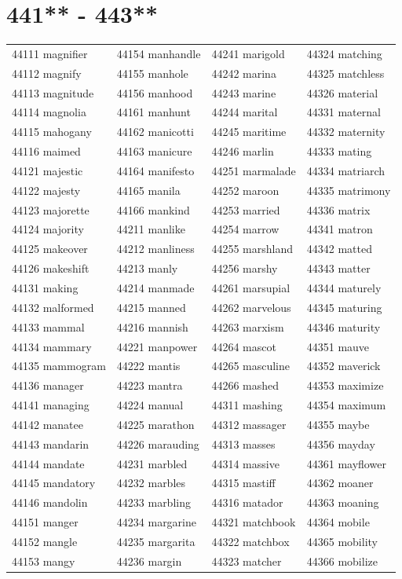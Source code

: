 \documentclass[10pt, oneside]{book}
\begin{document}
\begin{table}
	\centering
	\section*{441** - 443**}
	\begin{tabular}{l l l l}
44111 magnifier &44154 manhandle &44241 marigold &44324 matching\\
44112 magnify &44155 manhole &44242 marina &44325 matchless\\
44113 magnitude &44156 manhood &44243 marine &44326 material\\
44114 magnolia &44161 manhunt &44244 marital &44331 maternal\\
44115 mahogany &44162 manicotti &44245 maritime &44332 maternity\\
44116 maimed &44163 manicure &44246 marlin &44333 mating\\
44121 majestic &44164 manifesto &44251 marmalade &44334 matriarch\\
44122 majesty &44165 manila &44252 maroon &44335 matrimony\\
44123 majorette &44166 mankind &44253 married &44336 matrix\\
44124 majority &44211 manlike &44254 marrow &44341 matron\\
44125 makeover &44212 manliness &44255 marshland &44342 matted\\
44126 makeshift &44213 manly &44256 marshy &44343 matter\\
44131 making &44214 manmade &44261 marsupial &44344 maturely\\
44132 malformed &44215 manned &44262 marvelous &44345 maturing\\
44133 mammal &44216 mannish &44263 marxism &44346 maturity\\
44134 mammary &44221 manpower &44264 mascot &44351 mauve\\
44135 mammogram &44222 mantis &44265 masculine &44352 maverick\\
44136 manager &44223 mantra &44266 mashed &44353 maximize\\
44141 managing &44224 manual &44311 mashing &44354 maximum\\
44142 manatee &44225 marathon &44312 massager &44355 maybe\\
44143 mandarin &44226 marauding &44313 masses &44356 mayday\\
44144 mandate &44231 marbled &44314 massive &44361 mayflower\\
44145 mandatory &44232 marbles &44315 mastiff &44362 moaner\\
44146 mandolin &44233 marbling &44316 matador &44363 moaning\\
44151 manger &44234 margarine &44321 matchbook &44364 mobile\\
44152 mangle &44235 margarita &44322 matchbox &44365 mobility\\
44153 mangy &44236 margin &44323 matcher &44366 mobilize\\
	\end{tabular}
 \end{table}
\clearpage
\end{document}
